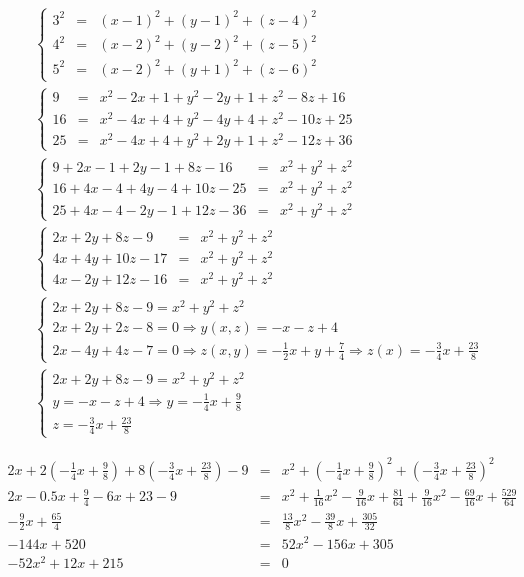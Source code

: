 \documentclass{article}
\begin{document}
\begin{align}
&\left\{\begin{array}{rcl}
3^2 &=& (x-1)^2 + (y-1)^2 + (z-4)^2 \\
4^2 &=& (x-2)^2 + (y-2)^2 + (z-5)^2 \\
5^2 &=& (x-2)^2 + (y+1)^2 + (z-6)^2 
\end{array}\right.
\\
&\left\{\begin{array}{rcl}
9 &=& x^2 - 2x + 1 + y^2-2y+1 +z^2-8z+16\\
16 &=& x^2-4x+4 +y^2-4y+4 + z^2-10z+25\\
25 &=& x^2-4x+4 +y^2+2y+1 +z^2-12z+36
\end{array}\right.
\\
&\left\{\begin{array}{rcl}
9 + 2x - 1 + 2y - 1 + 8z - 16 &=& x^2 + y^2 + z^2 \\
16 + 4x - 4 + 4y - 4 + 10z - 25 &=& x^2 + y^2 + z^2 \\
25 + 4x - 4 - 2y - 1 + 12z - 36 &=& x^2 + y^2 + z^2
\end{array}\right.
\\
&\left\{\begin{array}{rcl}
2x+2y+8z-9 &=& x^2 + y^2 + z^2 \\
4x+4y+10z-17 &=& x^2 + y^2 + z^2 \\
4x-2y+12z-16 &=& x^2 + y^2 + z^2
\end{array}\right.
\\
&\left\{\begin{array}{l}
2x+2y+8z-9=x^2 + y^2 + z^2 \\
2x+2y+2z-8 = 0 \Rightarrow y(x,z) = -x -z +4 \\
2x-4y+4z-7 = 0 \Rightarrow z(x,y) = -\frac{1}{2}x+y+\frac{7}{4} \Rightarrow z(x) = -\frac{3}{4}x + \frac{23}{8}
\end{array}\right.
\\
&\left\{\begin{array}{l}
2x+2y+8z-9=x^2 + y^2 + z^2 \\
y = -x -z +4 \Rightarrow y = -\frac{1}{4}x + \frac{9}{8} \\
z = -\frac{3}{4}x + \frac{23}{8}
\end{array}\right.
\end{align}

\begin{eqnarray}
2x + 2(-\frac{1}{4}x + \frac{9}{8}) + 8(-\frac{3}{4}x + \frac{23}{8}) - 9 &=&
x^2 + (-\frac{1}{4}x + \frac{9}{8})^2 + (-\frac{3}{4}x + \frac{23}{8})^2
\\
2x -0.5x + \frac{9}{4} -6x +23 -9 &=&
x^2 +\frac{1}{16}x^2 -\frac{9}{16}x +\frac{81}{64} +\frac{9}{16}x^2 -\frac{69}{16}x + \frac{529}{64}
\\
-\frac{9}{2}x + \frac{65}{4} &=& \frac{13}{8}x^2 -\frac{39}{8}x + \frac{305}{32}
\\
-144x + 520 &=& 52x^2 -156x + 305
\\
-52x^2 +12x +215 &=& 0
\end{eqnarray}
\end{document}
